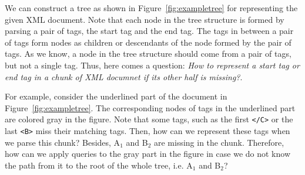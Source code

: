 We can construct a tree as shown in Figure~\ref{fig:exampletree} for
representing the given XML document. Note that each node in the tree structure
is formed by parsing a pair of tags, the start tag and the end tag. The tags in
between a pair of tags form nodes as children or descendants of the node formed
by the pair of tags. As we know, a node in the tree structure should come from a
pair of tags, but not a single tag. Thus, here comes a question: \emph{How to
represent a start tag or end tag in a chunk of XML documnet if its other half is
missing?}.

For example, consider the underlined part of the document in
Figure~\ref{fig:exampletree}. The corresponding nodes of tags in the underlined
part are colored gray in the figure. Note that some tags, such as the first
\verb|</C>| or the last \verb|<B>| miss their matching tags. Then, how can we
represent these tags when we parse this chunk?  Besides, A$_1$ and B$_2$ are
missing in the chunk. Therefore, how can we apply  queries to the gray part in
the figure in case we do not know the path  from it to the root of the whole
tree, i.e.  A$_1$ and B$_2$?

